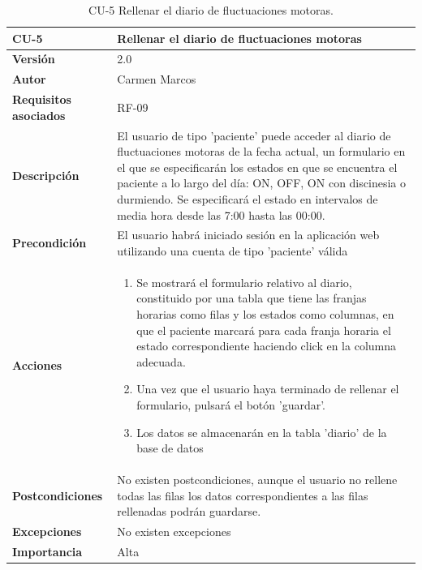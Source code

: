 \begin{table}[p]
	\centering
	\begin{tabularx}{\linewidth}{ p{} p{} }
		\toprule
		\textbf{CU-5}    & \textbf{Rellenar el diario de fluctuaciones motoras}\\
		\toprule
		\textbf{Versión}              & 2.0    \\
		\textbf{Autor}                & Carmen Marcos \\
		\textbf{Requisitos asociados} & RF-09 \\
		\textbf{Descripción}          & El usuario de tipo 'paciente' puede acceder al diario de fluctuaciones motoras de la fecha actual, un formulario en el que se especificarán los estados en que se encuentra el paciente a lo largo del día: ON, OFF, ON con discinesia o durmiendo. Se especificará el estado en intervalos de media hora desde las 7:00 hasta las 00:00.
        \\
		\textbf{Precondición}         & El usuario habrá iniciado sesión en la aplicación web utilizando una cuenta de tipo 'paciente' válida
		\\
		\textbf{Acciones}             & \begin{enumerate} \def\labelenumi{\arabic{enumi}.}
	\tightlist
		\item Se mostrará el formulario relativo al diario, constituido por una tabla que tiene las franjas horarias como filas y los estados como columnas, en que el paciente marcará para cada franja horaria el estado correspondiente haciendo click en la columna adecuada.
        \item Una vez que el usuario haya terminado de rellenar el formulario, pulsará el botón 'guardar'.
        \item Los datos se almacenarán en la tabla 'diario' de la base de datos
		\end{enumerate}\\
		\textbf{Postcondiciones}        & 		No existen postcondiciones, aunque el usuario no rellene todas las filas los datos correspondientes a las filas rellenadas podrán guardarse.
  \\
		\textbf{Excepciones}          & No existen excepciones \\
		\textbf{Importancia}          & Alta \\
		\bottomrule
	\end{tabularx}
	\caption{CU-5 Rellenar el diario de fluctuaciones motoras.}
        \label{tab:CU-5}
\end{table}


